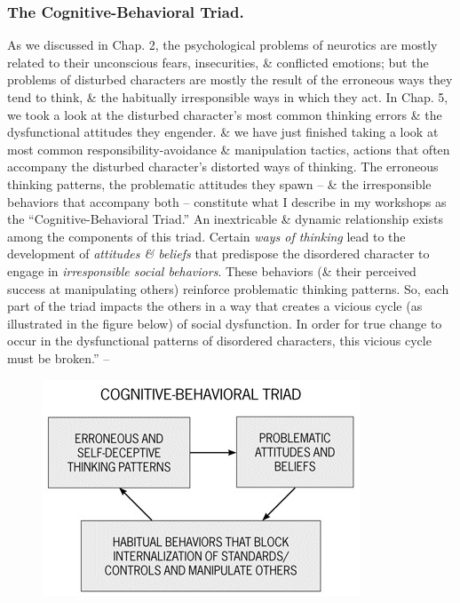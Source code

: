 \documentclass{article}
\numberwithin{equation}{section}
\begin{document}
\subsubsection{The Cognitive-Behavioral Triad.} As we discussed in Chap. 2, the psychological problems of neurotics are mostly related to their unconscious fears, insecurities, \& conflicted emotions; but the problems of disturbed characters are mostly the result of the erroneous ways they tend to think, \& the habitually irresponsible ways in which they act. In Chap. 5, we took a look at the disturbed character's most common thinking errors \& the dysfunctional attitudes they engender. \& we have just finished taking a look at most common responsibility-avoidance \& manipulation tactics, actions that often accompany the disturbed character's distorted ways of thinking. The erroneous thinking patterns, the problematic attitudes they spawn -- \& the irresponsible behaviors that accompany both -- constitute what I describe in my workshops as the ``Cognitive-Behavioral Triad.'' An inextricable \& dynamic relationship exists among the components of this triad. Certain \textit{ways of thinking} lead to the development of \textit{attitudes \& beliefs} that predispose the disordered character to engage in \textit{irresponsible social behaviors}. These behaviors (\& their perceived success at manipulating others) reinforce problematic thinking patterns. So, each part of the triad impacts the others in a way that creates a vicious cycle (as illustrated in the figure below) of social dysfunction. In order for true change to occur in the dysfunctional patterns of disordered characters, this vicious cycle must be broken.'' -- \cite[pp. 168--187]{Simon2011}
\begin{figure}[H]
	\centering
	\includegraphics[scale=.4]{Simon2011_5}
\end{figure}

\end{document}
